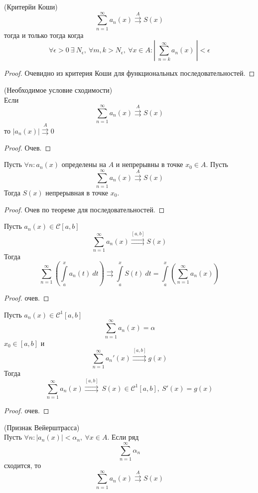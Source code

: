 \begin{theorem} (Критерйи Коши)\\
    \[\sum_{n=1}^{\infty}a_n(x)\overset{A}{\rightrightarrows}S(x)\]
    тогда и только тогда когда
    \[\forall \epsilon>0\ \exists\ N_{\epsilon},\ \forall m,k>N_{\epsilon},\ \forall x\in A: \left|\ \sum_{n=k}^{\infty}a_n(x)\ \right|<\epsilon\]
\end{theorem}
\begin{proof}
    Очевидно из критерия Коши для функциональных последовательностей.
\end{proof}
\begin{theorem} (Необходимое условие сходимости)\\
    Если
    \[\sum_{n=1}^{\infty}a_n(x)\overset{A}{\rightrightarrows}S(x)\]
    то $|a_n(x)|\overset{A}{\rightrightarrows}0$
\end{theorem}
\begin{proof}
    Очев.
\end{proof}
\begin{theorem}
    Пусть $\forall n: a_n(x)$ определены на $A$ и непрерывны в точке $x_0\in A$. Пусть
    \[\sum_{n=1}^{\infty}a_n(x)\overset{A}{\rightrightarrows}S(x)\]
    Тогда $S(x)$ непрерывная в точке $x_0$.
\end{theorem}
\begin{proof}
    Очев по теореме для последовательностей.
\end{proof}
\begin{theorem}
    Пусть $a_n(x)\in \mathcal{C}[a,b]$
    \[\sum_{n=1}^{\infty}a_n(x)\overset{[a,b]}{\rightrightarrows} S(x)\]
    Тогда 
    \[\sum_{n=1}^{\infty}\left(\int\limits_{a}^{x}a_n(t)\ dt\right)\rightrightarrows \int\limits_{a}^{x}S(t)\ dt=\int\limits_{a}^{x}\left(\sum_{n=1}^{\infty}a_n(x)\right)\]
\end{theorem}
\begin{proof}
    очев.
\end{proof}
\begin{theorem}
    Пусть $a_n(x)\in \mathcal{C}^1{[a,b]}$
    \[\sum_{n=1}^{\infty}a_n(x)=\alpha\]
    $x_0\in [a,b]$ и 
    \[\sum_{n=1}^{\infty}a_n'(x)\overset{[a,b]}\rightrightarrows g(x)\]
    Тогда
    \[\sum_{n=1}^{\infty}a_n(x)\overset{[a,b]}{\rightrightarrows}\ S(x)\in \mathcal{C}^1[a,b],\ S'(x)=g(x)\]
\end{theorem}
\begin{proof}
    очев.
\end{proof}
\begin{theorem} (Признак Вейерштрасса)\\
    Пусть $\forall n: |a_n(x)|<\alpha_n,\ \forall x\in A$. Если ряд
    \[\sum_{n=1}^{\infty}\alpha_n\]
    сходится, то
    \[\sum_{n=1}^{\infty}a_n(x)\overset{A}\rightrightarrows S(x)\]
\end{theorem}
